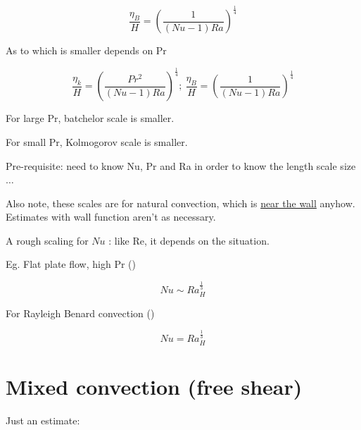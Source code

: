 \documentclass[12pt]{article}
\renewcommand{\_}{\kern-1.5pt\textunderscore\kern-1.5pt}
\begin{document}
 \[ \frac{ \eta _{B}}{H}= \left( \frac{1}{ \left( Nu-1 \right) Ra} \right) ^{\frac{1}{4}} \] \par

As to which is smaller depends on Pr\par

 \[ \frac{ \eta _{k}}{H}= \left( \frac{Pr^{2}}{ \left( Nu-1 \right) Ra} \right) ^{\frac{1}{4}};~\frac{ \eta _{B}}{H}= \left( \frac{1}{ \left( Nu-1 \right) Ra} \right) ^{\frac{1}{4}} \] \par


\vspace{\baselineskip}
For large Pr, batchelor scale is smaller.\par

For small Pr, Kolmogorov scale is smaller.\par


\vspace{\baselineskip}
Pre-requisite: need to know Nu, Pr and Ra in order to know the length scale size$ \ldots $ \par

Also note, these scales are for natural convection, which is \uline{near the wall} anyhow. Estimates with wall function aren’t as necessary.\par


\vspace{\baselineskip}
A rough scaling for  \( Nu \) : like Re, it depends on the situation.\par

Eg. Flat plate flow, high Pr (\cite{Bejan2013})\par

 \[ Nu \sim Ra_{H}^{\frac{1}{3}} \] \par

For Rayleigh Benard convection (\cite{Perry2015})\par

 \[ Nu=Ra_{H}^{\frac{1}{3}} \] \par


\vspace{\baselineskip}

\vspace{\baselineskip}
\section{Mixed convection (free shear)}\par

Just an estimate:\par
\end{document}
